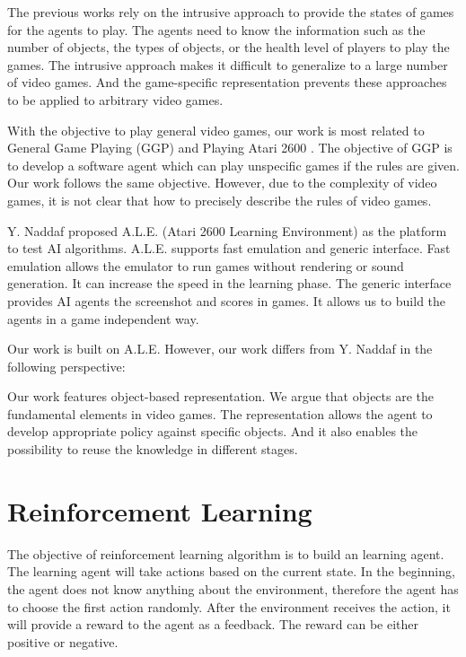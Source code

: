 The previous works rely on the intrusive approach to provide the states of games for the agents to play.
The agents need to know the information such as the number of objects, the types of objects,
or the health level of players to play the games. The intrusive approach makes it difficult to generalize
to a large number of video games. And the game-specific representation prevents these approaches
to be applied to arbitrary video games.

With the objective to play general video games, our work is most related to 
General Game Playing\cite{GGP} (GGP) and Playing Atari 2600 \cite{Yavar}. 
The objective of GGP is to develop a software agent which can play unspecific games if the rules
are given. Our work follows the same objective. However, due to the complexity of video games, 
it is not clear that how to precisely describe the rules of video games.

Y. Naddaf\cite{Yavar} proposed A.L.E. (Atari 2600 Learning Environment) as the platform to test AI algorithms.
A.L.E. supports fast emulation and generic interface. Fast emulation allows the emulator to run 
games without rendering or sound generation. It can increase the speed in the learning phase.
The generic interface provides AI agents the screenshot and scores in games. It allows us
to build the agents in a game independent way.

Our work is built on A.L.E. However, our work differs from Y. Naddaf in the following perspective:

\begin{itemize}{}
Our work features object-based representation. We argue that objects are the fundamental elements
in video games. The representation allows the agent to develop appropriate policy against specific 
objects. And it also enables the possibility to reuse the knowledge in different stages.
\end{itemize}

\chapter{Reinforcement Learning}
\label{ch:RL}
The objective of reinforcement learning algorithm is to build an learning agent. The learning agent will take
actions based on the current state. In the beginning, the agent does not know anything about 
the environment, therefore the agent has to choose the first action randomly. After the environment
receives the action, it will provide a reward to the agent as a feedback. The reward can be either
positive or negative.

